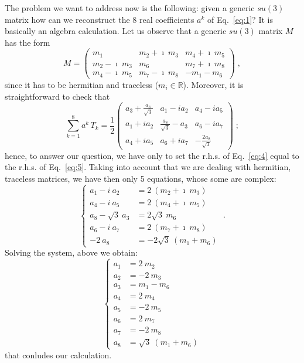 \documentclass[a4paper,10pt]{article}
\newcommand{\Eq}[1]{Eq.~\eqref{eq:#1}}
\begin{document}
The problem we want to address now is the following: given a generic $su(3)$ matrix
how can we reconstruct the 8 real coefficients $a^k$ of \Eq{1}? It is basically
an algebra calculation. Let us observe that a generic $su(3)$ matrix $M$ has the form
\begin{equation}\label{eq:4}
 M=\left(
  \begin{array}{ccc}
   m_1 & m_2+\imath\: m_3 & m_4+\imath\: m_5 \\
   m_2-\imath\: m_3 & m_6 & m_7+\imath\: m_8 \\
   m_4-\imath\: m_5 & m_7-\imath\: m_8 & -m_1-m_6
  \end{array}
 \right)\;,
\end{equation}
since it has to be hermitian and traceless ($m_i\in\mathbb{R}$). Moreover, it is straightforward
to check that
\begin{equation}\label{eq:5}
 \sum_{k=1}^8 a^k\, T_k = \frac{1}{2}
    \left(
      \begin{array}{ccc}
        a_3+\frac{a_8}{\sqrt{3}} & a_1-i a_2 & a_4-i a_5 \\
	a_1+i a_2 & \frac{a_8}{\sqrt{3}}-a_3 & a_6-i a_7 \\
	a_4+i a_5 & a_6+i a_7 & -\frac{2 a_8}{\sqrt{3}}
      \end{array}
    \right)\;;
\end{equation}
hence, to answer our question, we have only to set the r.h.s. of \Eq{4} equal to the r.h.s. of \Eq{5}.
Taking into account that  we are dealing with hermitian, traceless matrices, we have then only 5 equations,
whose some are complex:
\begin{equation}
 \left\{
  \begin{aligned}
    a_1-i\:a_2 &= 2\:(m_2+\imath\: m_3) \\
    a_4-i\:a_5 &= 2\:(m_4+\imath\: m_5) \\
    a_8-\sqrt{3}\:a_3 &= 2\sqrt{3}\: m_6 \\
    a_6-i\:a_7 &= 2\:(m_7+\imath\: m_8) \\
    -2\:a_8 &= - 2\sqrt{3}\:(m_1+m_6)
  \end{aligned}
 \right.\;.
\end{equation}
Solving the system, above we obtain:
\begin{equation}
 \left\{
  \begin{aligned}
    a_1 &= 2\:m_2 \\
    a_2 &= -2\:m_3 \\
    a_3 &= m_1-m_6 \\
    a_4 &= 2\:m_4 \\
    a_5 &= -2\:m_5 \\
    a_6 &= 2\:m_7 \\
    a_7 &= -2\:m_8 \\
    a_8 &= \sqrt{3}\:(m_1+m_6)
  \end{aligned}
 \right.
\end{equation}
that conludes our calculation.
\end{document}
